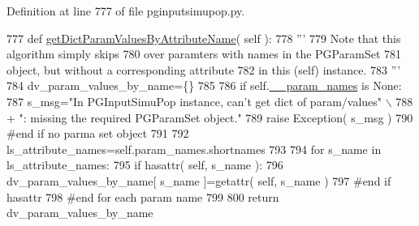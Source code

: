 Definition at line 777 of file pginputsimupop.\+py.


\begin{DoxyCode}
777     \textcolor{keyword}{def }\hyperlink{classnegui_1_1pginputsimupop_1_1PGInputSimuPop_a099e2f01dabe86e713df7519a08fecca}{getDictParamValuesByAttributeName}( self ):
778         \textcolor{stringliteral}{'''}
779 \textcolor{stringliteral}{        Note that this algorithm simply skips}
780 \textcolor{stringliteral}{        over paramters with names in the PGParamSet}
781 \textcolor{stringliteral}{        object, but without a corresponding attribute}
782 \textcolor{stringliteral}{        in this (self) instance.}
783 \textcolor{stringliteral}{        '''}
784         dv\_param\_values\_by\_name=\{\}
785 
786         \textcolor{keywordflow}{if} self.\hyperlink{classnegui_1_1pginputsimupop_1_1PGInputSimuPop_a0a737393cb4d1c66062f9403296c7f19}{\_\_param\_names} \textcolor{keywordflow}{is} \textcolor{keywordtype}{None}:
787             s\_msg=\textcolor{stringliteral}{"In PGInputSimuPop instance, can't get dict of param/values"} \(\backslash\)
788                     + \textcolor{stringliteral}{": missing the required PGParamSet object."}
789             \textcolor{keywordflow}{raise} Exception( s\_msg )
790         \textcolor{comment}{#end if no parma set object}
791 
792         ls\_attribute\_names=self.param\_names.shortnames
793 
794         \textcolor{keywordflow}{for} s\_name \textcolor{keywordflow}{in} ls\_attribute\_names:
795             \textcolor{keywordflow}{if} hasattr( self, s\_name ):
796                 dv\_param\_values\_by\_name[ s\_name ]=getattr( self, s\_name )
797             \textcolor{comment}{#end if hasattr}
798         \textcolor{comment}{#end for each param name}
799         
800         \textcolor{keywordflow}{return} dv\_param\_values\_by\_name
\end{DoxyCode}
